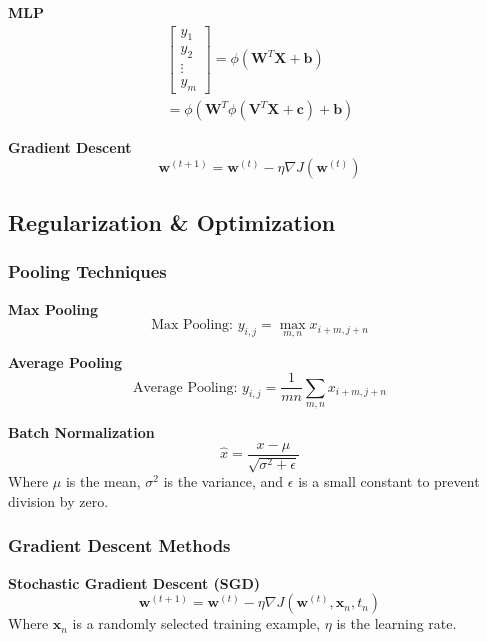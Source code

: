 \documentclass[10pt]{article}
\begin{document}
\begin{multicols}{2}
\textbf{MLP}
\begin{multline}
    \begin{bmatrix}
        y_1 \\
        y_2 \\
        \vdots \\
        y_m
    \end{bmatrix} = \phi(\mathbf{W}^T \mathbf{X} + \mathbf{b}) \\
    = \phi(\mathbf{W}^T \phi(\mathbf{V}^T \mathbf{X} + \mathbf{c}) + \mathbf{b})
\end{multline}

\textbf{Gradient Descent}
\begin{equation}
    \mathbf{w}^{(t+1)} = \mathbf{w}^{(t)} - \eta \nabla J(\mathbf{w}^{(t)})
\end{equation}

\subsection*{Regularization \& Optimization}

\subsubsection*{Pooling Techniques}

\textbf{Max Pooling}
\begin{equation}
    \text{Max Pooling: } y_{i,j} = \max_{m,n} x_{i+m, j+n}
\end{equation}

\textbf{Average Pooling}
\begin{equation}
    \text{Average Pooling: } y_{i,j} = \frac{1}{mn} \sum_{m,n} x_{i+m, j+n}
\end{equation}

\textbf{Batch Normalization}
\begin{equation}
    \hat{x} = \frac{x - \mu}{\sqrt{\sigma^2 + \epsilon}}
\end{equation}
Where $\mu$ is the mean, $\sigma^2$ is the variance, and $\epsilon$ is a small constant to prevent division by zero.

\subsubsection*{Gradient Descent Methods}

\textbf{Stochastic Gradient Descent (SGD)}
\begin{equation}
    \mathbf{w}^{(t+1)} = \mathbf{w}^{(t)} - \eta \nabla J(\mathbf{w}^{(t)}, \mathbf{x}_n, t_n)
\end{equation}
Where $\mathbf{x}_n$ is a randomly selected training example, $\eta$ is the learning rate.


\end{multicols}
\end{document}
